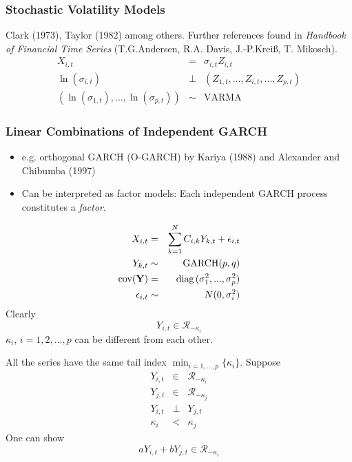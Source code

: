\documentclass{beamer}
\begin{document}
\begin{frame}
  \frametitle{Stochastic Volatility Models}
   Clark (1973), Taylor (1982) among others. Further references found
   in {\it Handbook of Financial Time Series} (T.G.Andersen,
   R.A. Davis, J.-P.Krei\ss, T. Mikosch).
  \begin{eqnarray*}
    X_{i,t} &=& \sigma_{i, t} Z_{i, t} \\
    \ln(\sigma_{i,t}) &\bot& (Z_{1, t}, ..., Z_{i, t}, ..., Z_{p,t}) \\
    (\ln(\sigma_{1,t}), \dots, \ln(\sigma_{p,t})) &\sim& \text{VARMA}
  \end{eqnarray*}
\end{frame}

\begin{frame}
  \frametitle{Linear Combinations of Independent GARCH}
  \begin{minipage}[t]{0.47\linewidth}
    \begin{scriptsize}
      \begin{itemize}
      \item e.g. orthogonal GARCH (O-GARCH) by Kariya (1988) and
        Alexander and Chibumba (1997)
      \item Can be interpreted as factor models: Each independent GARCH
        process constitutes a {\it factor}.
      \end{itemize}
      \begin{eqnarray*}
        X_{i, t} &=& \sum_{k=1}^N C_{i,k} Y_{k, t} + \epsilon_{i, t} \\
        Y_{k, t} &\sim& \text{GARCH}(p,q) \\
        \text{cov}(\mathbf{Y}) &=& \text{diag\,}(\sigma_1^2, ..., \sigma_p^2) \\
        \epsilon_{i,t} &\sim& N(0, \sigma_i^2)
      \end{eqnarray*}
      Clearly
      \[
      Y_{i,t} \in \mathcal R_{-\kappa_i}
      \]
      $\kappa_i$, $i=1,2,...,p$ can be different from each other.
    \end{scriptsize}
  \end{minipage}\hfill
  \begin{minipage}[t]{0.47\linewidth}
    \begin{scriptsize}
    All the series have the same tail index
    $\min_{i=1,...,p}\{\kappa_i\}$. Suppose
    \begin{eqnarray*}
      Y_{i,t}  &\in& \mathcal R_{-\kappa_i} \\
      Y_{j,t}  &\in& \mathcal R_{-\kappa_j} \\
      Y_{i,t} &\bot& Y_{j,t} \\
      \kappa_i &<& \kappa_j
    \end{eqnarray*}
    One can show
    \[
    a Y_{i, t} + b Y_{j,t} \in \mathcal R_{-\kappa_i}
    \]
    \end{scriptsize}
  \end{minipage}
  \end{frame}
\end{document}
